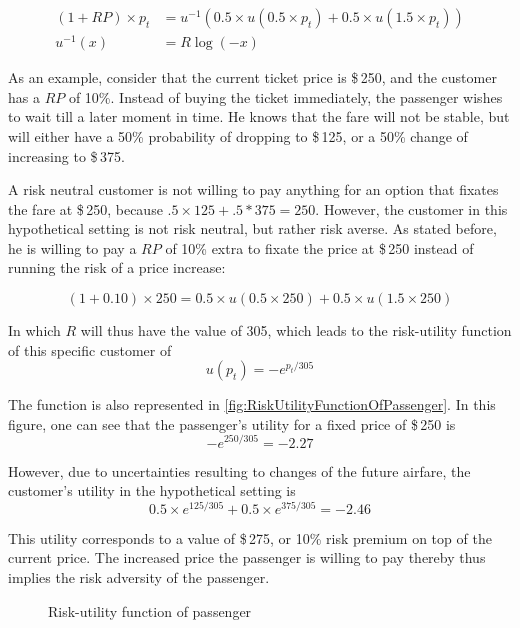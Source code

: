 \begin{align*}
    (1 + RP) \times p_t &= u^{-1}(0.5 \times u(0.5 \times p_t) + 0.5 \times u(1.5 \times p_t)) \\
    u^{-1}(x) &= R \log(-x)
\end{align*}

As an example, consider that the current ticket price is \$\,250, and the customer has a $RP$ of 10\%. Instead of buying the ticket immediately, the passenger wishes to wait till a later moment in time. He knows that the fare will not be stable, but will either have a 50\% probability of dropping to \$\,125, or a 50\% change of increasing to \$\,375.

A risk neutral customer is not willing to pay anything for an option that fixates the fare at \$\,250, because $.5 \times 125 + .5 * 375 = 250$. However, the customer in this hypothetical setting is not risk neutral, but rather risk averse. As stated before, he is willing to pay a $RP$ of 10\% extra to fixate the price at \$\,250 instead of running the risk of a price increase:

$$
(1 + 0.10) \times 250 = 0.5 \times u(0.5 \times 250) + 0.5 \times u(1.5 \times 250)
$$

In which $R$ will thus have the value of 305, which leads to the risk-utility function of this specific customer of
$$ u(p_t) = -e^{p_t/305} $$

The function is also represented in \autoref{fig:RiskUtilityFunctionOfPassenger}. In this figure, one can see that the passenger's utility for a fixed price of \$\,250 is
$$ -e^{250/305} = -2.27$$

However, due to uncertainties resulting to changes of the future airfare, the customer's utility in the hypothetical setting is
$$0.5 \times e^{125/305}+0.5 \times e^{375/305} = -2.46$$

This utility corresponds to a value of \$\,275, or 10\% risk premium on top of the current price. The increased price the passenger is willing to pay thereby thus implies the risk adversity of the passenger.

\begin{figure}
    \centering
    \caption{Risk-utility function of passenger}
    \label{fig:RiskUtilityFunctionOfPassenger}
\end{figure}

